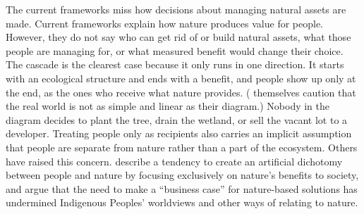 \documentclass[12pt]{article}
\begin{document}

The current frameworks miss how decisions about managing natural assets are made.  Current frameworks explain how nature produces value for people. However, they do not say who can get rid of or build natural assets, what those people are managing for, or what measured benefit would change their choice. The cascade is the clearest case because it only runs in one direction. It starts with an ecological structure and ends with a benefit, and people show up only at the end, as the ones who receive what nature provides. (\citet{haines-youngLinksBiodiversityEcosystem2010} themselves caution that the real world is not as simple and linear as their diagram.) Nobody in the diagram decides to plant the tree, drain the wetland, or sell the vacant lot to a developer. Treating people only as recipients also carries an implicit assumption that people are separate from nature rather than a part of the ecosystem. Others have raised this concern. \citet{nelsonIndigenousCritiquesRecommendations2025} describe a tendency to create an artificial dichotomy between people and nature by focusing exclusively on nature's benefits to society, and \citet{diepEmpoweringCitiesGlobally2025} argue that the need to make a ``business case'' for nature-based solutions has undermined Indigenous Peoples' worldviews and other ways of relating to nature.
\end{document}
